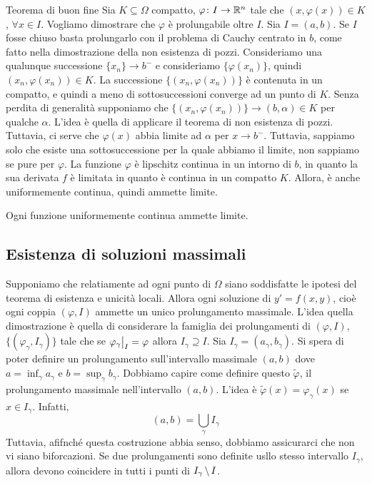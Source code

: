 \documentclass[a4paper]{article}
\begin{document}
\begin{snippetproof}{Teorema di buon fine}
    Sia \(K \subseteq \Omega\) compatto, \(\varphi \colon I \to \mathbb{R}^n\)
    tale che \((x, \varphi(x)) \in K\), \(\forall x \in I\).
    Vogliamo dimostrare che \(\varphi\) è prolungabile oltre \(I\).
    Sia \(I = (a,b)\). Se \(I\) fosse chiuso basta prolungarlo con il problema di Cauchy centrato in \(b\),
    come fatto nella dimostrazione della non esistenza di pozzi.
    Consideriamo una qualunque successione \(\{x_n\} \to b^-\)
    e consideriamo \(\{\varphi(x_n)\}\), quindi \((x_n, \varphi(x_n)) \in K\).
    La successione \(\{(x_n, \varphi(x_n))\}\) è contenuta in un compatto, e quindi
    a meno di sottosuccessioni converge ad un punto di \(K\).
    Senza perdita di generalità supponiamo che \(\{(x_n, \varphi(x_n))\} \to (b, \alpha) \in K\)
    per qualche \(\alpha\). L'idea è quella di applicare il teorema di non esistenza di pozzi.
    Tuttavia, ci serve che \(\varphi(x)\) abbia limite ad \(\alpha\) per \(x \to b^-\).
    Tuttavia, sappiamo solo che esiste una sottosuccessione per la quale abbiamo il limite,
    non sappiamo se pure per \(\varphi\).
    La funzione \(\varphi\) è lipschitz continua in un intorno di \(b\),
    in quanto la sua derivata \(f\) è limitata in quanto è continua in un compatto \(K\).
    Allora, è anche uniformemente continua, quindi ammette limite.
\end{snippetproof}

\begin{snippetproposition}{}
    Ogni funzione uniformemente continua ammette limite.
\end{snippetproposition}

\subsection{Esistenza di soluzioni massimali}

Supponiamo che relatiamente ad ogni punto di \(\Omega\)
siano soddisfatte le ipotesi del teorema di esistenza e unicità locali.
Allora ogni soluzione di \(y' = f(x,y)\),
cioè ogni coppia \((\varphi, I)\) ammette un unico prolungamento massimale.
L'idea quella dimostrazione è quella di considerare la famiglia dei prolungamenti
di \((\varphi, I)\), \(\{(\varphi_\gamma, I_\gamma)\}\)
tale che se \(\restr{\varphi_\gamma}{I} = \varphi\) allora \(I_\gamma \supseteq I\).
Sia \(I_\gamma = (a_\gamma, b_\gamma)\).
Si spera di poter definire un prolungamento sull'intervallo massimale \((a,b)\)
dove \(a = \inf_\gamma a_\gamma\) e \(b = \sup_\gamma b_\gamma\).
Dobbiamo capire come definire questo \(\tilde \varphi\), il prolungamento massimale nell'intervallo \((a,b)\).
L'idea è \(\tilde \varphi(x) = \varphi_\gamma(x)\)
se \(x \in I_\gamma\). Infatti,
\[
    (a,b) = \bigcup_\gamma I_\gamma
\]
Tuttavia, afifnché questa costruzione abbia senso, dobbiamo assicurarci che non vi siano biforcazioni.
Se due prolungamenti sono definite usllo stesso intervallo \(I_\gamma\), allora devono coincidere
in tutti i punti di \(I_\gamma \,\backslash\, I\).
\end{document}
